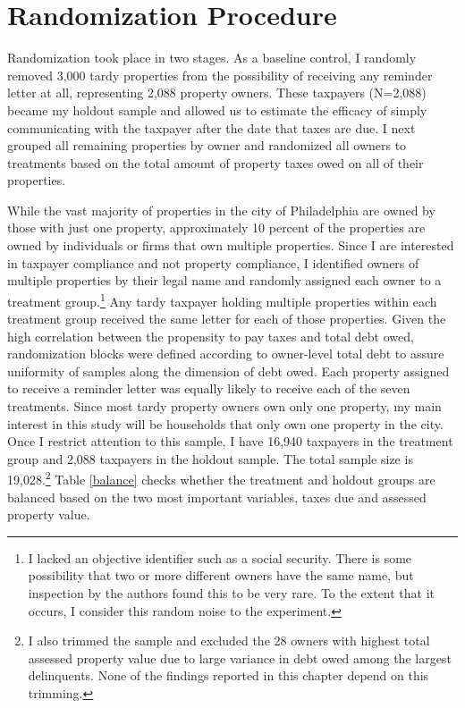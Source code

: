   
\section{Randomization Procedure}

Randomization took place in two stages.  As a baseline control, I
randomly removed 3,000 tardy properties from the possibility of
receiving any reminder letter at all, representing 2,088 property owners.  These taxpayers (N=2,088)
became my holdout sample and allowed us to estimate the efficacy of
simply communicating with the taxpayer after the date that taxes are
due. I next grouped all remaining properties by owner and randomized all owners to treatments based on the total amount of
property taxes owed on all of their properties. 

While the vast majority of properties in the city of Philadelphia are
owned by those with just one property, approximately 10 percent of the properties are
owned by individuals or firms that own multiple properties. Since I
are interested in taxpayer compliance and not property compliance, I
identified owners of multiple properties by their legal
name and randomly assigned each owner to a treatment
group.\footnote{I lacked an objective identifier such as a social
  security.  There is some possibility that two or more different
  owners have the same name, but inspection by the authors found this
  to be very rare.  To the extent that it occurs, I consider this
  random noise to the experiment.} Any tardy taxpayer holding
multiple properties within each treatment group received the same
letter for each of those properties.  Given the high correlation
between the propensity to pay taxes and total debt owed, randomization
blocks were defined according to owner-level total debt to assure
uniformity of samples along the dimension of debt owed. Each property
assigned to receive a reminder letter was equally likely to receive
each of the seven treatments. Since most tardy property owners own only one property, my main
interest in this study will be households that only
own one property in the city. Once I restrict attention to this
sample, I have 16,940 taxpayers in the treatment group and 2,088
taxpayers in the holdout sample.  The total sample size is
19,028.\footnote{I also trimmed the sample and excluded the 28 owners
  with highest total assessed property value due to large variance in debt 
  owed among the largest delinquents. None of the findings
  reported in this chapter depend on this trimming.}  Table \ref{balance}
checks whether the treatment and holdout groups are balanced based on
the two most important variables, taxes due and assessed property
value.

